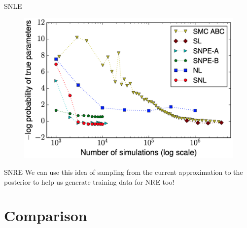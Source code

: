\documentclass[12pt, aspectratio=169]{beamer}
\begin{document}
\begin{frame}{SNLE}
    \begin{figure}
        \centering
        \includegraphics[height=0.7\textheight]{"images/SNLE_results2.png"}
        \caption{\cite{papamakarios_sequential_2019}}
    \end{figure}
\end{frame}


\begin{frame}{SNRE}
We can use this idea of sampling from the current approximation to the posterior to help us generate training data for NRE too! \parencite{durkan_contrastive_2020}
\end{frame}


\section{Comparison}
\end{document}
